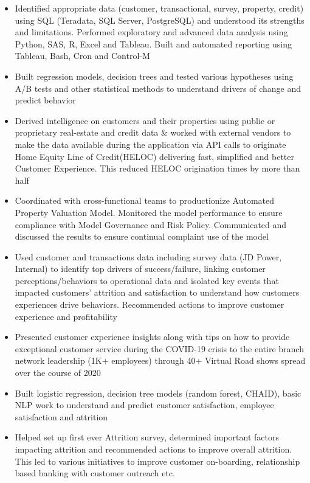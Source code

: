 \documentclass[a4paper,11pt]{article}
\begin{document}
\begin{itemize}\parskip=0cm
\item Identified appropriate data (customer, transactional, survey, property, credit) using SQL (Teradata, SQL Server, PostgreSQL) and understood its strengths and limitations. Performed exploratory and advanced data analysis using Python, SAS, R, Excel and Tableau. Built and automated reporting using Tableau, Bash, Cron and Control-M
\item Built regression models, decision trees and tested various hypotheses using A/B tests and other statistical methods to understand drivers of change and predict behavior
\item Derived intelligence on customers and their properties using public or proprietary real-estate and credit data \& worked with external vendors to make the data available during the application via API calls to originate Home Equity Line of Credit(HELOC) delivering fast, simplified and better Customer Experience. This reduced HELOC origination times by more than half
\item Coordinated with cross-functional teams to productionize Automated Property Valuation Model. Monitored the model performance to ensure compliance with Model Governance and Risk Policy. Communicated and discussed the results to ensure continual complaint use of the model
\item Used customer and transactions data including survey data (JD Power, Internal) to identify top drivers of success/failure, linking customer perceptions/behaviors to operational data and isolated key events that impacted customers’ attrition and satisfaction to understand how customers experiences drive behaviors. Recommended actions to improve customer experience and profitability
\item Presented customer experience insights along with tips on how to provide exceptional customer service during the COVID-19 crisis to the entire branch network leadership (1K+ employees) through 40+ Virtual Road shows spread over the course of 2020
\item Built logistic regression, decision tree models (random forest, CHAID), basic NLP work to understand and predict customer satisfaction, employee satisfaction and attrition
\item Helped set up first ever Attrition survey, determined important factors impacting attrition and recommended actions to improve overall attrition. This led to various initiatives to improve customer on-boarding, relationship based banking with customer outreach etc.

\end{itemize}
\end{document}
